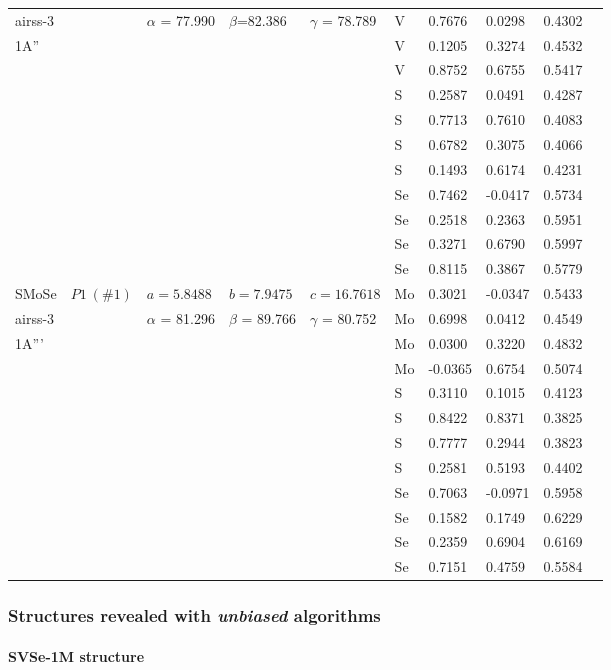 \documentclass[a4paperm]{article}
\begin{document}
\begin{table}[H]
\begin{tabular}{l*{9}{l}}
		airss-3&&$\alpha$ = 77.990& $\beta$=82.386& $\gamma$ = 78.789  & V	&	0.7676	&	0.0298	&	0.4302	\\		
	1A''&&&&&	V	&	0.1205	&	0.3274	&	0.4532	\\
		&&&&&	V	&	0.8752	&	0.6755	&	0.5417	\\
		&&&&&	S	&	0.2587	&	0.0491	&	0.4287	\\
		&&&&&	S	&	0.7713	&	0.7610	&	0.4083	\\
		&&&&&	S	&	0.6782	&	0.3075	&	0.4066	\\
		&&&&&	S	&	0.1493	&	0.6174	&	0.4231	\\
		&&&&&	Se	&	0.7462	&	-0.0417	&	0.5734	\\
		&&&&&	Se	&	0.2518	&	0.2363	&	0.5951	\\
		&&&&&	Se	&	0.3271	&	0.6790	&	0.5997	\\
		&&&&&	Se	&	0.8115	&	0.3867	&	0.5779	\\
		\hline
		SMoSe & $P1\ (\#1)$  &	$a=5.8488$ & $b=7.9475$ & $c=16.7618$  & Mo	&	0.3021	&	-0.0347	&	0.5433	\\
		airss-3&&$\alpha$ = 81.296& $\beta$ = 89.766& $\gamma$ = 80.752  & Mo	&	0.6998	&	0.0412	&	0.4549	\\		
   1A'''&&&&&	Mo	&	0.0300	&	0.3220	&	0.4832	\\
		&&&&&	Mo	&	-0.0365	&	0.6754	&	0.5074	\\
		&&&&&	S	&	0.3110	&	0.1015	&	0.4123	\\
		&&&&&	S	&	0.8422	&	0.8371	&	0.3825	\\
		&&&&&	S	&	0.7777	&	0.2944	&	0.3823	\\
		&&&&&	S	&	0.2581	&	0.5193	&	0.4402	\\
		&&&&&	Se	&	0.7063	&	-0.0971	&	0.5958	\\
		&&&&&	Se	&	0.1582	&	0.1749	&	0.6229	\\
		&&&&&	Se	&	0.2359	&	0.6904	&	0.6169	\\
		&&&&&	Se	&	0.7151	&	0.4759	&	0.5584	\\
		\hline
	\end{tabular}
\end{table}


\subsubsection{Structures revealed with {\it unbiased} algorithms}
\paragraph{SVSe-1M structure}
\end{document}
